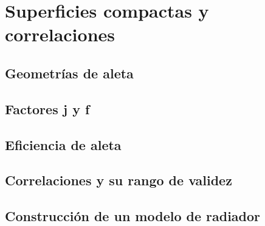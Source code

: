 \chapter{Superficies compactas y correlaciones}
\label{ch:superficies_compactas}

\begin{objetivos}
  \item {}
  \item {}
  \item {}
\end{objetivos}


\section{Geometrías de aleta}
\label{sec:superficies_compactas:01}

\section{Factores j y f}
\label{sec:superficies_compactas:02}

\section{Eficiencia de aleta}
\label{sec:superficies_compactas:03}

\section{Correlaciones y su rango de validez}
\label{sec:superficies_compactas:04}

\section{Construcción de un modelo de radiador}
\label{sec:superficies_compactas:05}

